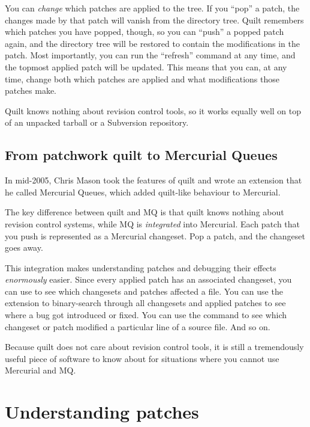 You can \emph{change} which patches are applied to the tree.  If you
``pop'' a patch, the changes made by that patch will vanish from the
directory tree.  Quilt remembers which patches you have popped,
though, so you can ``push'' a popped patch again, and the directory
tree will be restored to contain the modifications in the patch.  Most
importantly, you can run the ``refresh'' command at any time, and the
topmost applied patch will be updated.  This means that you can, at
any time, change both which patches are applied and what
modifications those patches make.

Quilt knows nothing about revision control tools, so it works equally
well on top of an unpacked tarball or a Subversion repository.

\subsection{From patchwork quilt to Mercurial Queues}
\label{sec:mq:quilt-mq}

In mid-2005, Chris Mason took the features of quilt and wrote an
extension that he called Mercurial Queues, which added quilt-like
behaviour to Mercurial.

The key difference between quilt and MQ is that quilt knows nothing
about revision control systems, while MQ is \emph{integrated} into
Mercurial.  Each patch that you push is represented as a Mercurial
changeset.  Pop a patch, and the changeset goes away.

This integration makes understanding patches and debugging their
effects \emph{enormously} easier.  Since every applied patch has an
associated changeset, you can use  to
see which changesets and patches affected a file.  You can use the
 extension to binary-search through all changesets and
applied patches to see where a bug got introduced or fixed.  You can
use the  command to see which changeset or patch
modified a particular line of a source file.  And so on.

Because quilt does not care about revision control tools, it is still
a tremendously useful piece of software to know about for situations
where you cannot use Mercurial and MQ.

\section{Understanding patches}
\label{sec:mq:patch}

